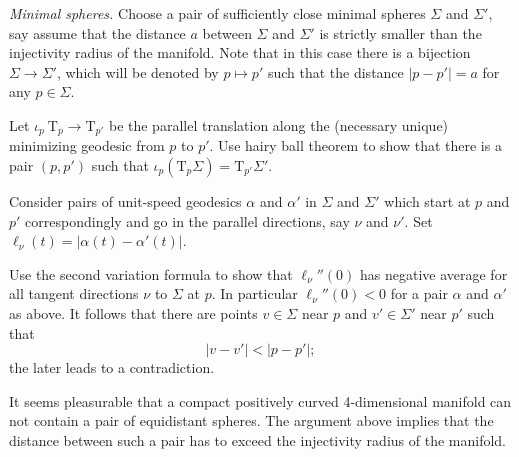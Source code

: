                                                       



\textit{Minimal spheres.}
Choose a pair of sufficiently close minimal spheres $\Sigma$ and $\Sigma'$,
say assume that the distance $a$ between $\Sigma$ and $\Sigma'$ is strictly smaller than the injectivity radius of the manifold.
Note that in this case there is a bijection $\Sigma\to \Sigma'$, which will be denoted by $p\mapsto p'$ such that the distance $|p-p'|=a$ for any $p\in\Sigma$.

Let $\iota_p\:\mathrm{T}_p\to\mathrm{T}_{p'}$ be the parallel translation along the (necessary unique) minimizing geodesic from $p$ to $p'$.
Use hairy ball theorem 
to show that there is a pair $(p,p')$ such that $\iota_p(\mathrm{T}_p\Sigma)=\mathrm{T}_{p'}\Sigma'$.

Consider pairs of unit-speed geodesics $\alpha$ and $\alpha'$ 
in $\Sigma$ and $\Sigma'$  
which start at $p$ and $p'$ correspondingly
and go in the parallel directions, say $\nu$ and $\nu'$. 
Set $\ell_\nu(t)=|\alpha(t)-\alpha'(t)|$.

Use the second variation formula to show that $\ell_\nu''(0)$ has negative average for all tangent directions $\nu$ to $\Sigma$ at $p$. 
In particular $\ell_\nu''(0)<0$ for a pair $\alpha$ and $\alpha'$ as above.
It follows that there are points $v\in\Sigma$ near $p$ 
and $v'\in\Sigma'$ near $p'$
such that 
\[|v-v'|<|p-p'|;\]
the later leads to a contradiction.

It seems pleasurable that a 
compact 
positively curved 
4-dimensional manifold
can not contain a pair of equidistant spheres.
The argument above implies that the distance between such a pair has to exceed the injectivity radius of the manifold.

